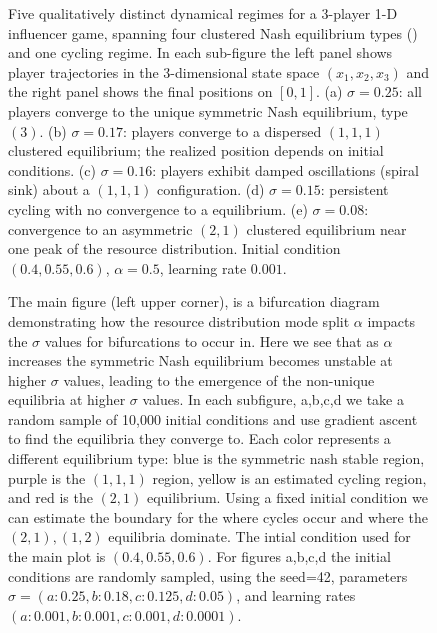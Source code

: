 \documentclass{article}
\begin{document}
\begin{figure}[ht!]
                        \caption{Five qualitatively distinct dynamical regimes for a 3-player 1-D influencer game, spanning four clustered Nash equilibrium types () and one cycling regime. In each sub-figure the left panel shows player trajectories in the 3-dimensional state space $(x_1,x_2,x_3)$ and the right panel shows the final positions on $[0,1]$. (a) $\sigma=0.25$: all players converge to the unique symmetric Nash equilibrium, type $(3)$. (b) $\sigma=0.17$: players converge to a dispersed $(1,1,1)$ clustered equilibrium; the realized position depends on initial conditions. (c) $\sigma=0.16$: players exhibit damped oscillations (spiral sink) about a $(1,1,1)$ configuration. (d) $\sigma=0.15$: persistent cycling with no convergence to a equilibrium. (e) $\sigma=0.08$: convergence to an asymmetric $(2,1)$ clustered equilibrium near one peak of the resource distribution. Initial condition $(0.4,0.55,0.6)$, $\alpha=0.5$, learning rate $0.001$.}
                        \label{fig:3player_equilibria} 
                    \end{figure}


                    \begin{figure}
                        \centering
                        
                        \caption{The main figure (left upper corner), is a bifurcation diagram demonstrating how the resource distribution mode split $\alpha$ impacts the $\sigma$ values for bifurcations to occur in. Here we see that as $\alpha$ increases the symmetric Nash equilibrium becomes unstable at higher $\sigma$ values, leading to the emergence of the non-unique equilibria at higher $\sigma$ values. In each subfigure, a,b,c,d we take a random sample of 10,000 initial  conditions and use gradient ascent to find the equilibria they converge to. Each color represents a different equilibrium type: blue is the symmetric nash stable region, purple is the $(1,1,1)$ region, yellow is an estimated cycling region, and red is the $(2,1)$ equilibrium. Using a fixed initial condition we can estimate the boundary for the where cycles occur and where the $(2,1),(1,2)$ equilibria dominate. The intial condition used for the main plot is $(0.4,0.55,0.6)$. For figures a,b,c,d the initial conditions are randomly sampled, using the seed=42, parameters $\sigma =(a:0.25,b:0.18,c:0.125,d:0.05)$, and learning rates $(a:0.001,b:0.001,c:0.001,d:0.0001)$.} 
                        \label{fig:3player_bifurcation}
                     \end{figure}
\end{document}
